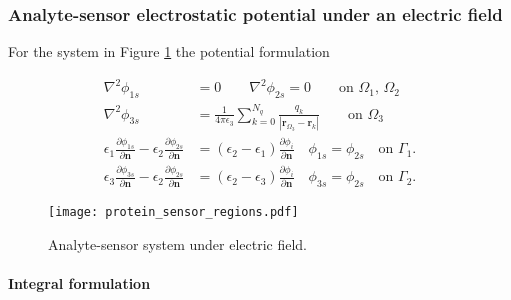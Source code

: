 
\subsubsection{Analyte-sensor electrostatic potential under an electric field}

For the system in Figure \ref{fig:analyte-sensor} the potential formulation

%
\begin{align} \label{eq:electrostatic_scatter_prot_sen}
\nabla^2 \phi_{1s} &= 0 \qquad \nabla^2 \phi_{2s} = 0 \qquad\text{on $\Omega_1$, $\Omega_2$} \nonumber\\
\nabla^2 \phi_{3s} &= \frac{1}{4\pi\epsilon_3} \sum_{k=0}^{N_q} \frac{q_k}{|\mathbf{r}_{\Omega_3} - \mathbf{r}_k|} \qquad\text{on $\Omega_3$} \nonumber \\
\epsilon_1\frac{\partial\phi_{1s}}{\partial \mathbf{n}} - \epsilon_2\frac{\partial\phi_{2s}}{\partial\mathbf{n}} &= (\epsilon_2-\epsilon_1)\frac{\partial\phi_i}{\partial\mathbf{n}} \quad \phi_{1s} = \phi_{2s} \quad \text{on $\Gamma_1$}. \nonumber\\
\epsilon_3\frac{\partial\phi_{3s}}{\partial \mathbf{n}} - \epsilon_2\frac{\partial\phi_{2s}}{\partial\mathbf{n}} &= (\epsilon_2-\epsilon_3)\frac{\partial\phi_i}{\partial\mathbf{n}} \quad \phi_{3s} = \phi_{2s} \quad \text{on $\Gamma_2$}.
\end{align}
%

\begin{figure}[h] %
    \centering
    \texttt{[image: protein\_sensor\_regions.pdf]} 
    \caption{Analyte-sensor system under electric field.}
    \label{fig:analyte-sensor}
 \end{figure}

\paragraph{Integral formulation}

